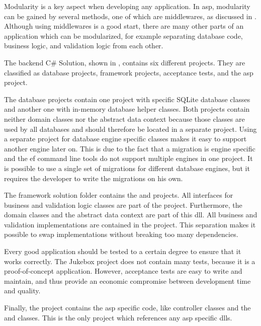 Modularity is a key aspect when developing any application. In \gls{asp}, modularity can be gained by several methods, one of which are middlewares, as discussed in . Although using middlewares is a good start, there are many other parts of an application which can be modularized, for example separating database code, business logic, and validation logic from each other.


The backend C\# Solution, shown in , contains six different projects. They are classified as database projects, framework projects, acceptance tests, and the \gls{asp} project.

The database projects contain one project with specific SQLite database classes and another one with in-memory database helper classes. Both projects contain neither domain classes nor the abstract data context because those classes are used by all databases and should therefore be located in a separate project. Using a separate project for database engine specific classes makes it easy to support another engine later on. This is due to the fact that a migration is engine specific and the \gls{ef} command line tools do not support multiple engines in one project. It is possible to use a single set of migrations for different database engines, but it requires the developer to write the migrations on his own.

The framework solution folder contains the  and  projects. All interfaces for business and validation logic classes are part of the  project. Furthermore, the domain classes and the abstract data context are part of this \gls{dll}. All business and validation implementations are contained in the  project. This separation makes it possible to swap implementations without breaking too many dependencies.

Every good application should be tested to a certain degree to ensure that it works correctly. The Jukebox project does not contain many tests, because it is a proof-of-concept application. However, acceptance tests are easy to write and maintain, and thus provide an economic compromise between development time and quality.

Finally, the  project contains the \gls{asp} specific code, like controller classes and the  and  classes. This is the only project which references any \gls{asp} specific \glspl{dll}.

